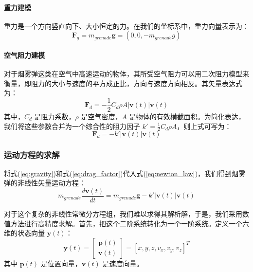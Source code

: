 \documentclass[fontset=SimSun]{ctexart}
\begin{document}
\paragraph{重力建模}
重力是一个方向竖直向下、大小恒定的力。在我们的坐标系中，重力向量表示为：
\begin{equation}
\mathbf{F}_g = m_{grenade}\mathbf{g} = (0, 0, -m_{grenade}g)
\label{eq:gravity}
\end{equation}

\paragraph{空气阻力建模}
对于烟雾弹这类在空气中高速运动的物体，其所受空气阻力可以用二次阻力模型来衡量，即阻力的大小与速度的平方成正比，方向与速度方向相反。其矢量表达式为：
\begin{equation}
\mathbf{F}_d = - \frac{1}{2} C_d \rho A |\mathbf{v}(t)| \mathbf{v}(t)
\label{eq:drag_quadratic}
\end{equation}
其中，$C_d$ 是阻力系数，$\rho$ 是空气密度，$A$ 是物体的有效横截面积。为简化表达，我们将这些参数合并为一个综合性的阻力因子 $k' = \frac{1}{2} C_d \rho A$，则上式可写为：
\begin{equation}
\mathbf{F}_d = -k' |\mathbf{v}(t)| \mathbf{v}(t)
\label{eq:drag_factor}
\end{equation}

\subsubsection{运动方程的求解}

将式(\ref{eq:gravity})和式(\ref{eq:drag_factor})代入式(\ref{eq:newton_law})，我们得到烟雾弹的非线性矢量运动方程：
\begin{equation}
m_{grenade} \frac{d\mathbf{v}(t)}{dt} = m_{grenade}\mathbf{g} - k' |\mathbf{v}(t)| \mathbf{v}(t)
\label{eq:motion_vector_nonlinear}
\end{equation}

对于这个复杂的非线性常微分方程组，我们难以求得其解析解，于是，我们采用数值方法进行高精度求解。首先，把这个二阶系统转化为一个一阶系统。定义一个六维的状态向量 $\mathbf{y}(t)$：
\begin{equation}
\mathbf{y}(t) = \begin{bmatrix} \mathbf{p}(t) \\ \mathbf{v}(t) \end{bmatrix} = [x, y, z, v_x, v_y, v_z]^T
\end{equation}
其中 $\mathbf{p}(t)$ 是位置向量，$\mathbf{v}(t)$ 是速度向量。
\end{document}
